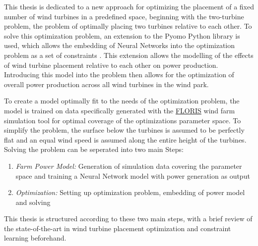 \documentclass[preprint,12pt]{elsarticle}
\begin{document}
%


This thesis is dedicated to a new approach for optimizing the placement of a fixed number of wind turbines in a predefined space, beginning with the two-turbine problem, the problem of optimally placing two turbines relative to each other. To solve this optimization problem, an extension to the Pyomo Python library is used, which allows the embedding of Neural Networks into the optimization problem as a set of constraints \cite{ALCANTARA2023120895}. This extension allows the modelling of the effects of wind turbine placement relative to each other on power production. Introducing this model into the problem then allows for the optimization of overall power production across all wind turbines in the wind park.

To create a model optimally fit to the needs of the optimization problem, the model is trained on data specifically generated with the \href{https://www.nrel.gov/wind/floris.html}{FLORIS} \cite{nrel_floris} wind farm simulation tool  for optimal coverage of the optimizations parameter space. To simplify the problem, the surface below the turbines is assumed to be perfectly flat and an equal wind speed is assumed along the entire height of the turbines. Solving the problem can be seperated into two main Steps:

\begin{enumerate}
	\item \textit{Farm Power Model:} Generation of simulation data covering the parameter space and training a Neural Network model with power generation as output
	\item \textit{Optimization:} Setting up optimization problem, embedding of power model and solving
\end{enumerate}

This thesis is structured according to these two main steps, with a brief review of the state-of-the-art in wind turbine placement optimization and constraint learning beforehand. 

\end{document}
